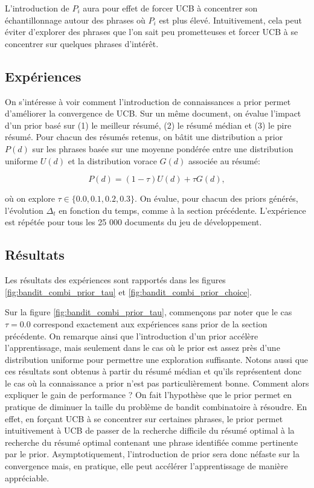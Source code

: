 L'introduction de $P_i$ aura pour effet de forcer UCB à concentrer son échantillonnage autour des 
phrases où $P_i$ est plus élevé.
Intuitivement, cela peut éviter d'explorer des phrases que l'on sait peu prometteuses
et forcer UCB à se concentrer sur quelques phrases d'intérêt.

\subsection{Expériences}
\label{sec:experiences_ucb_priors}

On s'intéresse à voir comment l'introduction de connaissances a prior permet d'améliorer 
la convergence de UCB.
Sur un même document, on évalue l'impact d'un prior basé sur (1) le meilleur résumé, (2)
le résumé médian et (3) le pire résumé.
Pour chacun des résumés retenus, on bâtit une distribution a prior $P(d)$ sur les phrases 
basée sur une moyenne pondérée entre une distribution uniforme
$U(d)$ et la distribution vorace $G(d)$ associée au résumé:

\begin{equation}
    P(d) = (1 - \tau) U(d) + \tau G(d),
\end{equation}

où on explore $\tau \in \{0.0, 0.1, 0.2, 0.3\}$.
On évalue, pour chacun des priors générés, l'évolution $\Delta_t$ en fonction du temps,
comme à la section précédente.
L'expérience est répétée pour tous les 25 000 documents du jeu de développement.

\subsection{Résultats}

Les résultats des expériences sont rapportés dans les figures \ref{fig:bandit_combi_prior_tau}
et \ref{fig:bandit_combi_prior_choice}.

Sur la figure \ref{fig:bandit_combi_prior_tau}, commençons par noter que le cas $\tau=0.0$
correspond exactement aux expériences sans prior de la section précédente.
On remarque ainsi que l'introduction d'un
prior accélère l'apprentissage, mais seulement dans le cas où le prior est assez près 
d'une distribution uniforme pour permettre une exploration suffisante.
Notons aussi que ces résultats sont obtenus à partir du résumé médian et qu'ils représentent 
donc le cas où la connaissance a prior n'est pas particulièrement bonne.
Comment alors expliquer le gain de performance ? 
On fait l'hypothèse que le prior permet en pratique de diminuer la taille du problème 
de bandit combinatoire à résoudre.
En effet, en forçant UCB à se concentrer sur certaines phrases, le prior permet intuitivement à UCB 
de passer de la recherche difficile du résumé optimal à la recherche du résumé optimal 
contenant une phrase identifiée comme pertinente par le prior.
Asymptotiquement, l'introduction de prior sera donc néfaste sur la convergence mais, en pratique,
elle peut accélérer l'apprentissage de manière appréciable.

